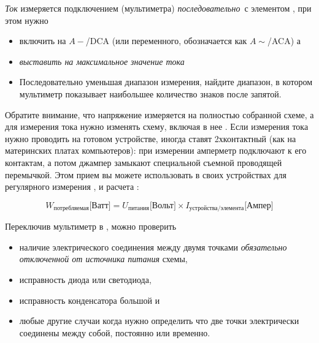 \begin{framed}
\emph{Ток} измеряется  подключением  (мультиметра) \emph{последовательно}\ с элементом , при этом
нужно
\begin{itemize}
\item
{} включить на
 $A-$/DCA (или переменного, обозначается
как $A\sim$/ACA) а
  \item {} \emph{выставить на максимальное значение тока}
\item 
Последовательно уменьшая диапазон измерения, найдите диапазон, в котором
мультиметр показывает наибольшее количество знаков после запятой. 
\end{itemize}
\end{framed}

Обратите внимание, что напряжение измеряется  на полностью
собранной схеме, а для измерения тока нужно изменять схему, включая в нее
. Если измерения тока нужно проводить на готовом устройстве,
иногда ставят 2хконтактный  (как на материнских платах
компьютеров): при измерении амперметр подключают к его контактам, а потом
джампер замыкают специальной съемной проводящей перемычкой. Этом прием вы можете
использовать в своих устройствах для регулярного измерения , и расчета :

\begin{equation}
W_{\mbox{потребляемая}}\mbox{[Ватт]} = 
U_{\mbox{питания}}\mbox{[Вольт]} 
\times
I_{\mbox{устройства/элемента}}\mbox{[Ампер]}
\end{equation}

\begin{framed}
Переключив мультиметр в , можно проверить
\begin{itemize} 
\item наличие
электрического соединения между двумя точками \emph{обязательно отключенной от
источника питания} схемы,
\item исправность диода или светодиода,
\item исправность конденсатора большой  и
\item любые другие случаи когда нужно определить что две точки электрически
соединены между собой, постоянно или временно.
\end{itemize}
\end{framed}

